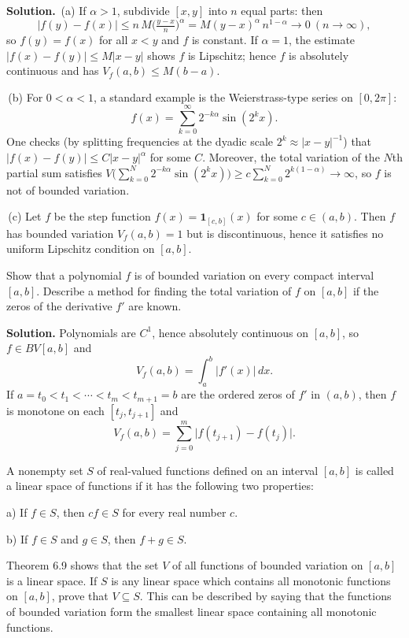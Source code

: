 \noindent\textbf{Solution.}
\,(a) If $\alpha>1$, subdivide $[x,y]$ into $n$ equal parts: then
\[|f(y)-f(x)|\le n\,M\Big(\tfrac{y-x}{n}\Big)^{\!\alpha}=M(y-x)^{\alpha}\,n^{1-\alpha}\to 0\ (n\to\infty),\]
so $f(y)=f(x)$ for all $x<y$ and $f$ is constant. If $\alpha=1$, the estimate $|f(x)-f(y)|\le M|x-y|$ shows $f$ is Lipschitz; hence $f$ is absolutely continuous and has $V_f(a,b)\le M(b-a)$.

\,(b) For $0<\alpha<1$, a standard example is the Weierstrass-type series on $[0,2\pi]$:
\[f(x)=\sum_{k=0}^{\infty}2^{-k\alpha}\sin(2^k x).\]
One checks (by splitting frequencies at the dyadic scale $2^k\approx |x-y|^{-1}$) that $|f(x)-f(y)|\le C|x-y|^{\alpha}$ for some $C$. Moreover, the total variation of the $N$th partial sum satisfies $V\big(\sum_{k=0}^N2^{-k\alpha}\sin(2^k x)\big)\ge c\sum_{k=0}^N2^{k(1-\alpha)}\to\infty$, so $f$ is not of bounded variation.

\,(c) Let $f$ be the step function $f(x)=\mathbf{1}_{[c,b]}(x)$ for some $c\in(a,b)$. Then $f$ has bounded variation $V_f(a,b)=1$ but is discontinuous, hence it satisfies no uniform Lipschitz condition on $[a,b]$.

\begin{problembox}
Show that a polynomial $f$ is of bounded variation on every compact interval $[a, b]$. Describe a method for finding the total variation of $f$ on $[a, b]$ if the zeros of the derivative $f'$ are known.
\end{problembox}

\noindent\textbf{Solution.}
Polynomials are $C^1$, hence absolutely continuous on $[a,b]$, so $f\in BV[a,b]$ and
\[V_f(a,b)=\int_a^b |f'(x)|\,dx.\]
If $a=t_0<t_1<\cdots<t_m<t_{m+1}=b$ are the ordered zeros of $f'$ in $(a,b)$, then $f$ is monotone on each $[t_j,t_{j+1}]$ and
\[V_f(a,b)=\sum_{j=0}^{m}\big|f(t_{j+1})-f(t_j)\big|.\]

\begin{problembox}
A nonempty set $S$ of real-valued functions defined on an interval $[a, b]$ is called a linear space of functions if it has the following two properties:

a) If $f \in S$, then $cf \in S$ for every real number $c$.

b) If $f \in S$ and $g \in S$, then $f + g \in S$.

Theorem 6.9 shows that the set $V$ of all functions of bounded variation on $[a, b]$ is a linear space. If $S$ is any linear space which contains all monotonic functions on $[a, b]$, prove that $V \subseteq S$. This can be described by saying that the functions of bounded variation form the smallest linear space containing all monotonic functions.
\end{problembox}

